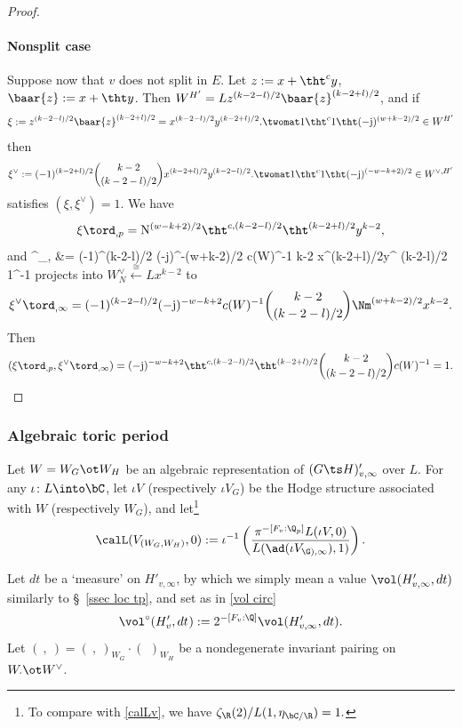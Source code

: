 \begin{proof}
\paragraph{Nonsplit case}
Suppose now that $v$ does not split in $E$. Let $z:= x+\tht^{c} y$, $\baar{z}:=x+\tht y$. Then $W^{H'} = L z^{(k-2-l)/2}\baar{z}^{ (k-2+l)/2}$, and if
$$ \xi :=z^{(k-2-l)/2}\baar{z}^{ (k-2+l)/2}=  x^{(k-2-l)/2}y^{ (k-2+l)/2} .\twomat 1{\tht^{c}} 1{\tht}  (-{\rm j})^{(w+k-2)/2} \in W^{H'}$$
then
$$\xi^{\vee}:=  (-1)^{(k-2+l)/2} {k-2 \choose  {(k-2-l)/2}} x^{(k-2+l)/2}y^{ (k-2-l)/2}  .\twomat 1{\tht^{c}} 1{\tht}  (-{\rm j})^{(-w-k+2)/2} \in W^{\vee, H'}$$
satisfies $( \xi, \xi^{\vee})=1$.
We have
$$ \xi {\tord}_{, p}= {\rm N}^{(w-k+2)/2}   \tht^{c,(k-2-l)/2} \tht^{(k-2+l)/2} y^{k-2}  ,$$
and
\beqq
\xi^{\vee}{\tord}_{,\infty}
&=  (-1)^{(k-2-l)/2}  (-{\rm j})^{-(w+k-2)/2} c(W)^{-1}
 {k-2 } x^{(k-2+l)/2}y^{ (k-2-l)/2}   1{\Nm^{-1}\tht} \eeqq
projects into $W^{\vee}_{N} \stackrel{\cong}{\leftarrow} Lx^{k-2}$ to
$$\xi^{\vee}{\tord}_{,\infty} =  (-1)^{(k-2-l)/2}   (-{\rm j})^{-w-k+2}  c(W)^{-1} {k-2 \choose  {(k-2-l)/2}} \Nm^{(w+k-2)/2}
x^{k-2}.
$$
Then
$$(  \xi {\tord}_{, p}, \xi^{\vee}{\tord}_{,\infty})=   (-{\rm j})^{-w-k+2 }  \tht^{c,(k-2-l)/2} \tht^{(k-2+l)/2} {k-2 \choose  {(k-2-l)/2}} c(W)^{-1}=1 .$$
\end{proof}



\subsubsection{Algebraic  toric period}
Let  $W =W_{G} \ot W_{H}$ be an  algebraic representation of $(G\ts H)'_{v,\infty}$ over $L$.
For any $\iota\colon L\into \bC$, let $\iota V_{ }$ (respectively $\iota V_{G}$) be the Hodge structure associated with $W$ (respectively $W_{G}$),
 and let\footnote{To compare with \eqref{calLv}, we have $\zeta_{\R}(2)/L(1, \eta_{\bC/\R})=1.$}
$$\calL(V_{(W_{G}, W_{H})}, 0):= \iota^{-1}\left({\pi^{-[F_{v}:\Q_{p}]}L(\iota V_{}, 0) \over L(\ad(\iota V_{\G), \infty}), 1)}\right).$$

Let $dt$ be a `measure' on $H'_{v, \infty}$, by which we simply mean a value $\vol(H'_{v, \infty }, dt)$ similarly to \S~\ref{ssec loc tp}, and set as in \eqref{vol circ}
$$ {\vol^{\circ}(H'_{v}, dt_{})} :=2^{-[F_{v}:\Q]} \vol(H'_{v, \infty }, dt).$$
 Let $(\ , \ )=(\ ,  \ )_{W_{G}}\cdot(\, \ )_{W_{H}}$ be a nondegenerate invariant pairing on $W. \ot W^{\vee}$.

